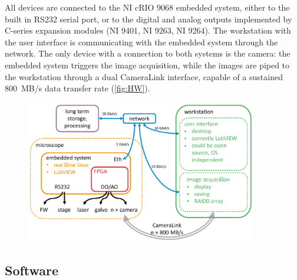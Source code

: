     All devices are connected to the NI cRIO 9068 embedded system, either to the built in RS232 serial port, or to the digital and analog outputs implemented by C-series expansion modules (NI 9401, NI 9263, NI 9264). The workstation with the user interface is communicating with the embedded system through the network. The only device with a connection to both systems is the camera: the embedded system triggers the image acquisition, while the images are piped to the workstation through a dual CameraLink interface, capable of a sustained \SI{800}{MB/s} data transfer rate (\autoref{fig:HW}).

    \begin{figure}
      \centering
      \includegraphics[width=0.9\textwidth]{HW}
      \label{fig:HW}
    \end{figure}
  
  \subsection{Software}
    \label{sec:software}

